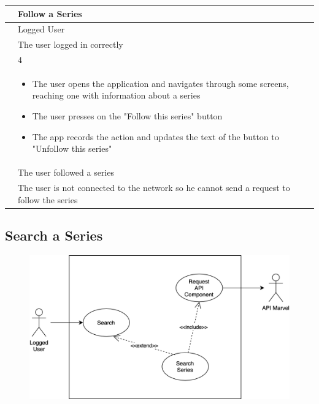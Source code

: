 {{{{{{{{\renewcommand{\arraystretch}{2}
{\begin{center}
\begin{tabular}{ | m{4cm} | m{9cm} | } 
 \hline
 {\centering{\textbf{Name}}} & Follow a Series \\
 \hline
 {\centering{\textbf{Actor}}} & Logged User \\
 \hline
 {\centering{\textbf{Entry Condition}}} & The user logged in correctly \\
 \hline
 {\centering{\textbf{Goal}}} & 4 \\
 \hline
 {\centering{\textbf{Event flow}}} & \begin{itemize}[leftmargin=*]
 	\item The user opens the application and navigates through some screens, reaching one with information about a series
	\item The user presses on the "Follow this series" button 
	\item The app records the action and updates the text of the button to "Unfollow this series"
	\end{itemize} \\	
 \hline
 {\centering{\textbf{Exit condition}}} & The user followed a series \\
 \hline
 {\centering{\textbf{Exceptions}}} & The user is not connected to the network so he cannot send a request to follow the series \\
 \hline
\end{tabular}
\end{center}}


\clearpage

\subsection{Search a Series}
\begin{figure}[h]
\centering
\includegraphics[width=\textwidth]{img/usecases/search}
\end{figure}

}}}}}}}}
